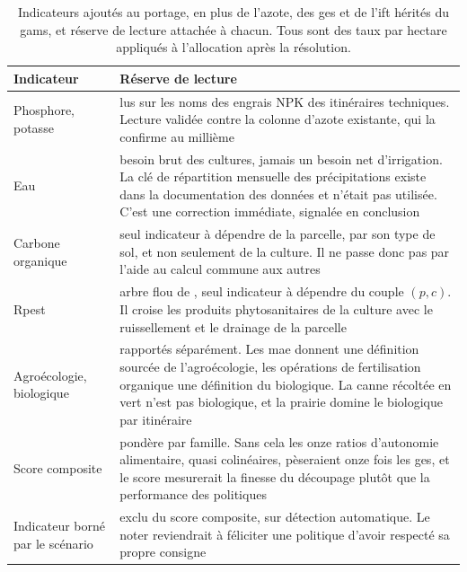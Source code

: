 \begin{table}[H]
  \centering
  \caption{Indicateurs ajoutés au portage, en plus de l'azote, des \gls{ges} et de l'\gls{ift}
  hérités du \gls{gams}, et réserve de lecture attachée à chacun. Tous sont des taux par
  hectare appliqués à l'allocation après la résolution.}
  \label{tab:ann-indicateurs}
  \scriptsize
  \setlength{\tabcolsep}{4pt}
  \begin{tabularx}{\textwidth}{@{}p{30mm}X@{}}
    \toprule
    \textbf{Indicateur} & \textbf{Réserve de lecture} \\
    \midrule
    Phosphore, potasse & lus sur les noms des engrais NPK des itinéraires techniques. Lecture
      validée contre la colonne d'azote existante, qui la confirme au millième \\
    Eau & besoin brut des cultures, jamais un besoin net d'irrigation. La clé de répartition
      mensuelle des précipitations existe dans la documentation des données et n'était pas
      utilisée. C'est une correction immédiate, signalée en conclusion \\
    Carbone organique & seul indicateur à dépendre de la parcelle, par son type de sol, et non
      seulement de la culture. Il ne passe donc pas par l'aide au calcul commune aux autres \\
    Rpest & arbre flou de \textcite{tixier2007}, seul indicateur à dépendre du couple $(p,c)$.
      Il croise les produits phytosanitaires de la culture avec le ruissellement et le
      drainage de la parcelle \\
    Agroécologie, biologique & rapportés séparément. Les \gls{mae} donnent une définition
      sourcée de l'agroécologie, les opérations de fertilisation organique une définition du
      biologique. La canne récoltée en vert n'est pas biologique, et la prairie domine le
      biologique par itinéraire \\
    \midrule
    Score composite & pondère par famille. Sans cela les onze ratios d'autonomie alimentaire,
      quasi colinéaires, pèseraient onze fois les \gls{ges}, et le score mesurerait la finesse
      du découpage plutôt que la performance des politiques \\
    Indicateur borné par le scénario & exclu du score composite, sur détection automatique. Le
      noter reviendrait à féliciter une politique d'avoir respecté sa propre consigne \\
    \bottomrule
  \end{tabularx}
\end{table}

